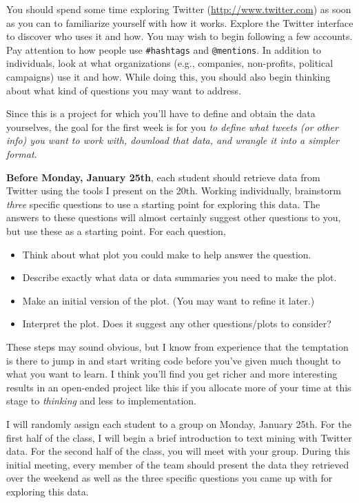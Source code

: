 \documentclass[11pt, oneside]{article}   	%
\begin{document}
You should spend some time exploring Twitter (\url{http://www.twitter.com}) as
soon as you can to familiarize yourself with how it works.  Explore the Twitter
interface to discover who uses it and how. You may wish to begin following
a few accounts.  Pay attention to how people use \verb|#hashtags| and
\verb|@mentions|.  In addition to individuals, look at what organizations
(e.g., companies, non-profits, political campaigns) use it and how.  While
doing this, you should also begin thinking about what kind of questions you may
want to address.

Since this is a project for which you'll have to define and obtain the data
yourselves, the goal for the first week is for you \emph{to define what tweets
(or other info) you want to work with, download that data, and wrangle it into
a simpler format}. 

\textbf{Before Monday, January 25th}, each student should retrieve data from
Twitter using the tools I present on the 20th.  Working individually, 
brainstorm {\em three} specific
questions to use a starting point for exploring this data. The answers to these
questions will almost certainly suggest other questions to you, but use these
as a starting point.  For each question,
\begin{itemize}
\item Think about what plot you could make to help answer the question.
\item Describe exactly what data or data summaries you need to make the plot.
\item Make an initial version of the plot. (You may want to refine it later.)
\item Interpret the plot. Does it suggest any other questions/plots to consider?
\end{itemize}
These steps may sound obvious, but I know from experience that the temptation
is there to jump in and start writing code before you've given much thought to
what you want to learn. I think you'll find you get richer and more interesting
results in an open-ended project like this if you allocate more of your time at
this stage to {\em thinking} and less to implementation.

I will randomly assign each student to a group on Monday, January 25th.  For
the first half of the class, I will begin a brief introduction to text mining
with Twitter data.  For the second half of the class, you will meet with your
group.  During this initial meeting, every member of the team should present the
data they retrieved over the weekend as well as the three specific questions
you came up with for exploring this data.
\end{document}
